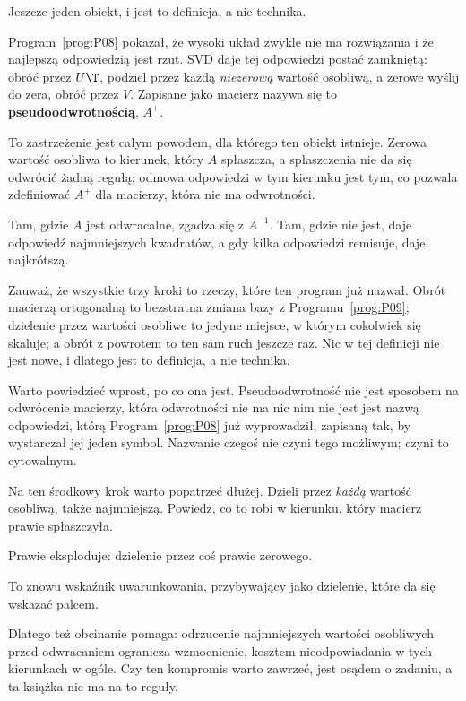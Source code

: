 \begin{fr}
Jeszcze jeden obiekt, i jest to definicja, a nie technika.

Program~\ref{prog:P08} pokazał, że wysoki układ zwykle nie ma rozwiązania i że
najlepszą odpowiedzią jest rzut. SVD daje tej odpowiedzi postać zamkniętą:
obróć przez $U\T$, podziel przez każdą \emph{niezerową} wartość osobliwą, a
zerowe wyślij do zera, obróć przez $V$. Zapisane jako macierz nazywa się to
\textbf{pseudoodwrotnością}, $A^{+}$.

To zastrzeżenie jest całym powodem, dla którego ten obiekt istnieje. Zerowa
wartość osobliwa to kierunek, który $A$ spłaszcza, a spłaszczenia nie da się
odwrócić żadną regułą; odmowa odpowiedzi w tym kierunku jest tym, co pozwala
zdefiniować $A^{+}$ dla macierzy, która nie ma odwrotności.

Tam, gdzie $A$ jest odwracalne, zgadza się z $A^{-1}$. Tam, gdzie nie jest,
daje odpowiedź najmniejszych kwadratów, a gdy kilka odpowiedzi remisuje, daje
najkrótszą.

Zauważ, że wszystkie trzy kroki to rzeczy, które ten program już nazwał. Obrót
macierzą ortogonalną to bezstratna zmiana bazy z Programu~\ref{prog:P09};
dzielenie przez wartości osobliwe to jedyne miejsce, w którym cokolwiek się
skaluje; a obrót z powrotem to ten sam ruch jeszcze raz. Nic w tej definicji
nie jest nowe, i dlatego jest to definicja, a nie technika.

Warto powiedzieć wprost, po co ona jest. Pseudoodwrotność nie jest sposobem na
odwrócenie macierzy, która odwrotności nie ma \dash{} nic nim nie jest \dash{}
jest nazwą odpowiedzi, którą Program~\ref{prog:P08} już wyprowadził, zapisaną
tak, by wystarczał jej jeden symbol. Nazwanie czegoś nie czyni tego możliwym;
czyni to cytowalnym.

Na ten środkowy krok warto popatrzeć dłużej. Dzieli przez \emph{każdą} wartość
osobliwą, także najmniejszą. Powiedz, co to robi w kierunku, który macierz
prawie spłaszczyła.
\dotline
\nextframe
\end{fr}

\begin{fr}
\begin{ansblock}
Prawie eksploduje: dzielenie przez coś prawie zerowego.
\end{ansblock}

To znowu wskaźnik uwarunkowania, przybywający jako dzielenie, które da się
wskazać palcem.

Dlatego też obcinanie pomaga: odrzucenie najmniejszych wartości osobliwych
przed odwracaniem ogranicza wzmocnienie, kosztem nieodpowiadania w tych
kierunkach w ogóle. Czy ten kompromis warto zawrzeć, jest osądem o zadaniu, a
ta książka nie ma na to reguły.
\end{fr}


